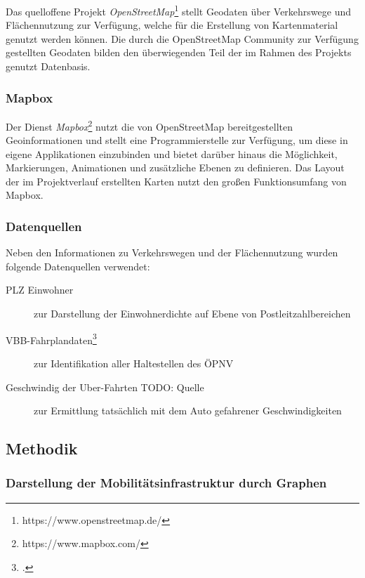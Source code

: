 Das quelloffene Projekt \emph{OpenStreetMap}\footnote{https://www.openstreetmap.de/} stellt Geodaten über Verkehrswege und Flächennutzung zur Verfügung, welche für die Erstellung von Kartenmaterial genutzt werden können. Die durch die OpenStreetMap Community zur Verfügung gestellten Geodaten bilden den überwiegenden Teil der im Rahmen des Projekts genutzt Datenbasis.

\subsubsection{Mapbox}
\label{mapbox}

Der Dienst \emph{Mapbox}\footnote{https://www.mapbox.com/} nutzt die von OpenStreetMap bereitgestellten Geoinformationen und stellt eine Programmierstelle zur Verfügung, um diese in eigene Applikationen einzubinden und bietet darüber hinaus die Möglichkeit, Markierungen, Animationen und zusätzliche Ebenen zu definieren. Das Layout der im Projektverlauf erstellten Karten nutzt den großen Funktionsumfang von Mapbox.

\subsubsection{Datenquellen}
\label{datenquellen}

Neben den Informationen zu Verkehrswegen und der Flächennutzung wurden folgende Datenquellen verwendet:

\begin{description}
    \item[PLZ Einwohner] zur Darstellung der Einwohnerdichte auf Ebene von Postleitzahlbereichen
    \item[VBB-Fahrplandaten\footcite{Fahrplandaten}] zur Identifikation aller Haltestellen des \ac{ÖPNV}
    \item[Geschwindig der Uber-Fahrten TODO: Quelle] zur Ermittlung tatsächlich mit dem Auto gefahrener Geschwindigkeiten
\end{description}

\subsection{Methodik}
\label{methodik}

\subsubsection{Darstellung der Mobilitätsinfrastruktur durch Graphen}
\label{darstellung_der_mobiltaetsinfrastruktur_durch_graphen}

